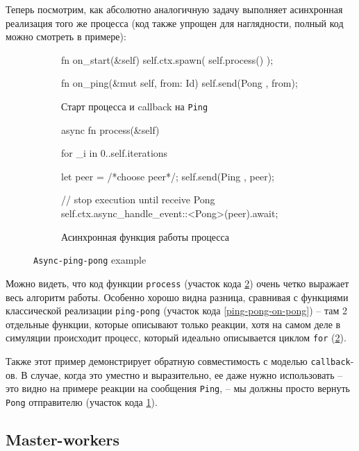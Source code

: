 Теперь посмотрим, как абсолютно аналогичную задачу выполняет асинхронная реализация того же процесса (код также упрощен для наглядности, полный код можно смотреть в примере\cite{async-ping-pong-example}): 

\begin{figure}[H]
    \centering
    \begin{subfigure}[b]{0.45\linewidth}
        \footnotesize
        \centering
        \begin{rustcode}
fn on_start(&self) {
  self.ctx.spawn(
    self.process()
  );
}

fn on_ping(&mut self, from: Id) {
  self.send(Pong {}, from);
}    
    \end{rustcode}
        \caption{Старт процесса и callback на \texttt{Ping}}
        \label{start-async-ping-pong}
    \end{subfigure}
    \hfill
    \begin{subfigure}[b]{0.54\linewidth}
        \footnotesize
        \centering
        \begin{rustcode}
async fn process(&self) {
  for _i in 0..self.iterations {
    let peer = /*choose peer*/;
    self.send(Ping {}, peer);

    // stop execution until receive Pong
    self.ctx.async_handle_event::<Pong>(peer).await;
  }
}
    \end{rustcode}
    \caption{Асинхронная функция работы процесса}
    \label{async-ping-pong-action}
\end{subfigure}
\caption{\texttt{Async-ping-pong} example}
\label{async-ping-pong-code}
\end{figure}

Можно видеть, что код функции \texttt{process} (участок кода \ref{async-ping-pong-action}) очень четко выражает весь алгоритм работы. Особенно хорошо видна разница, сравнивая с функциями классической реализации \texttt{ping-pong} (участок кода \ref{ping-pong-on-pong}) -- там 2 отдельные функции, которые описывают только реакции, хотя на самом деле в симуляции происходит процесс, который идеально описывается циклом \texttt{for} (\ref{async-ping-pong-action}). 

Также этот пример демонстрирует обратную совместимость с моделью \texttt{callback}-ов. В случае, когда это уместно и выразительно, ее даже нужно использовать -- это видно на примере реакции на сообщения \texttt{Ping}, -- мы должны просто вернуть \texttt{Pong} отправителю (участок кода \ref{start-async-ping-pong}). 

\subsection{Master-workers}\label{master-workers-subsection}

